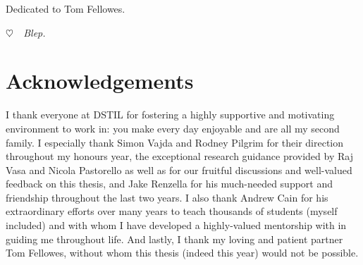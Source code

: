 \cleardoublepage
\pagestyle{empty}
\begin{center}
  \vspace*{0.3\paperheight}
  Dedicated to Tom Fellowes.
  
  {\color{white} \itshape $\heartsuit$~~Blep.}
\end{center}

\chapter*{Acknowledgements}

I thank everyone at DSTIL for fostering a highly supportive and motivating environment to work in: you make every day enjoyable and are all my second family. I especially thank Simon Vajda and Rodney Pilgrim for their direction throughout my honours year, the exceptional research guidance provided by Raj Vasa and Nicola Pastorello as well as for our fruitful discussions and well-valued feedback on this thesis, and Jake Renzella for his much-needed support and friendship throughout the last two years. I also thank Andrew Cain for his extraordinary efforts over many years to teach thousands of students (myself included) and with whom I have developed a highly-valued mentorship with in guiding me throughout life. And lastly, I thank my loving and patient partner Tom Fellowes, without whom this thesis (indeed this year) would not be possible.